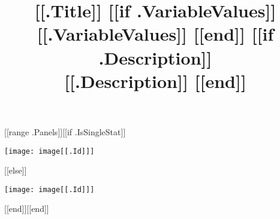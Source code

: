 \documentclass{article}
\begin{document}
    \title{[[.Title]] [[if .VariableValues]] \\ \large [[.VariableValues]] [[end]] [[if .Description]] \\ \small [[.Description]] [[end]]}
    \maketitle
    \begin{center}
        [[range .Panels]][[if .IsSingleStat]]\begin{minipage}{0.3\textwidth}
                                                 \texttt{[image: image[[.Id]]]}
        \end{minipage}
        [[else]]\par
        \vspace{0.5cm}
        \texttt{[image: image[[.Id]]]}
        \par
        \vspace{0.5cm}
        [[end]][[end]]

    \end{center}
\end{document}
